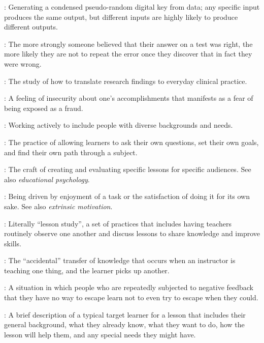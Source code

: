 \begin{description}
: Generating a condensed pseudo-random digital key
from data; any specific input produces the same output, but different inputs are
highly likely to produce different outputs.

: The more strongly someone
believed that their answer on a test was right, the more likely they are not to
repeat the error once they discover that in fact they were wrong.

: The study of how to
translate research findings to everyday clinical practice.

: A feeling of insecurity about
one's accomplishments that manifests as a fear of being exposed as a fraud.

: Working actively to include people with
diverse backgrounds and needs.

: The practice of
allowing learners to ask their own questions, set their own goals, and find
their own path through a subject.

: The craft of creating and
evaluating specific lessons for specific audiences. See also \emph{educational
  psychology}.

: Being driven by enjoyment
of a task or the satisfaction of doing it for its own sake.  See also
\emph{extrinsic motivation}.

: Literally ``lesson study'', a set of
practices that includes having teachers routinely observe one another and
discuss lessons to share knowledge and improve skills.

: The
``accidental'' transfer of knowledge that occurs when an instructor is teaching
one thing, and the learner picks up another.

: A situation in which
people who are repeatedly subjected to negative feedback that they have no way
to escape learn not to even try to escape when they could.

: A brief description of a typical
target learner for a lesson that includes their general background, what they
already know, what they want to do, how the lesson will help them, and any
special needs they might have.


\end{description}
